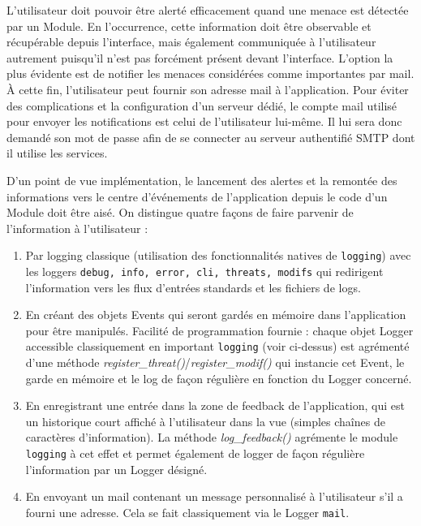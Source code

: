 \documentclass[]{article}
\begin{document}
\par L'utilisateur doit pouvoir être alerté efficacement quand une menace est détectée par un Module. En l'occurrence, cette information doit être observable et récupérable depuis l'interface, mais également communiquée à l'utilisateur autrement puisqu'il n'est pas forcément présent devant l'interface. L'option la plus évidente est de notifier les menaces considérées comme importantes par mail. À cette fin, l'utilisateur peut fournir son adresse mail à l'application. Pour éviter des complications et la configuration d'un serveur dédié, le compte mail utilisé pour envoyer les notifications est celui de l'utilisateur lui-même. Il lui sera donc demandé son mot de passe afin de se connecter au serveur authentifié SMTP dont il utilise les services.\\

\par D'un point de vue implémentation, le lancement des alertes et la remontée des informations vers le centre d’événements de l'application depuis le code d'un Module doit être aisé. On distingue quatre façons de faire parvenir de l'information à l'utilisateur :
\begin{enumerate}
\item Par logging classique (utilisation des fonctionnalités natives de \texttt{logging}) avec les loggers \texttt{debug, info, error, cli, threats, modifs} qui redirigent l'information vers les flux d'entrées standards et les fichiers de logs.
\vspace{0.1cm}
\item En créant des objets Events qui seront gardés en mémoire dans l'application pour être manipulés. Facilité de programmation fournie : chaque objet Logger accessible classiquement en important \texttt{logging} (voir ci-dessus) est agrémenté d'une méthode \textit{register\_threat()}/\textit{register\_modif()} qui instancie cet Event, le garde en mémoire et le log de façon régulière en fonction du Logger concerné.
\vspace{0.1cm}
\item En enregistrant une entrée dans la zone de feedback de l'application, qui est un historique court affiché à l'utilisateur dans la vue (simples chaînes de caractères d'information). La méthode \textit{log\_feedback()} agrémente le module \texttt{logging} à cet effet et permet également de logger de façon régulière l'information par un Logger désigné.
\vspace{0.1cm}
\item En envoyant un mail contenant un message personnalisé à l'utilisateur s'il a fourni une adresse. Cela se fait classiquement via le Logger \texttt{mail}. 
\end{enumerate}
\vspace{0.1cm}
\end{document}
